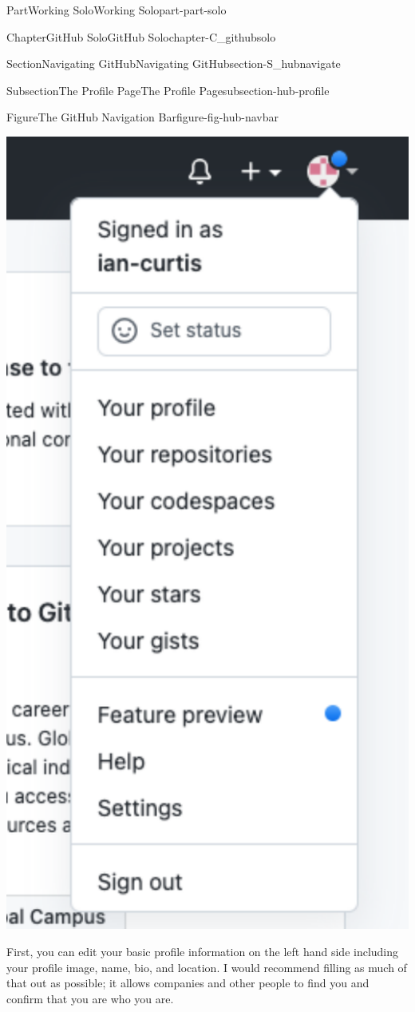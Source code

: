 \documentclass[oneside,10pt,]{book}
\begin{document}
\begin{partptx}{Part}{Working Solo}{}{Working Solo}{}{}{part-part-solo}
\begin{chapterptx}{Chapter}{GitHub Solo}{}{GitHub Solo}{}{}{chapter-C_githubsolo}
\begin{sectionptx}{Section}{Navigating GitHub}{}{Navigating GitHub}{}{}{section-S_hubnavigate}
\begin{subsectionptx}{Subsection}{The Profile Page}{}{The Profile Page}{}{}{subsection-hub-profile}
\begin{figureptx}{Figure}{The GitHub Navigation Bar}{figure-fig-hub-navbar}{}
\begin{image}{0.35}{0.3}{0.35}{}
\includegraphics[width=\linewidth]{external/hub_navbar.pdf}
\end{image}%
\tcblower
\end{figureptx}%
First, you can edit your basic profile information on the left hand side including your profile image, name, bio, and location. I would recommend filling as much of that out as possible; it allows companies and other people to find you and confirm that you are who you are.%

\end{subsectionptx}
\end{sectionptx}
\end{chapterptx}
\end{partptx}
\end{document}
